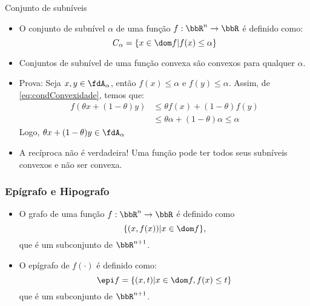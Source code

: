 \begin{frame}{Conjunto de subníveis}
  \begin{itemize}
    \item O conjunto de subnível $\alpha$ de uma função $f: \bbR^n \rightarrow \bbR$ é definido como:
    \begin{equation}
      C_\alpha = \{x \in \dom f | f(x) \leq \alpha\}
      \label{eq:conjuntoSubnivel}
    \end{equation}
    \item Conjuntos de subnível de uma função convexa são convexos para qualquer $\alpha$.
    \item Prova:
    Seja $x, y \in \fdA_\alpha$, então $f(x) \leq \alpha$ e $f(y) \leq \alpha$. Assim, de \eqref{eq:condConvexidade}, 
    temos que:
    \begin{align*}
      f(\theta x + (1-\theta) y) & \leq \theta f(x) + (1-\theta) f(y) \\
      & \leq \theta \alpha + (1-\theta) \alpha \leq \alpha 
    \end{align*}
    Logo, $\theta x + (1-\theta) y \in \fdA_\alpha$
    \item \alert{A recíproca não é verdadeira!} Uma função pode ter todos seus subníveis convexos e não ser convexa.
  \end{itemize}
\end{frame}

\begin{frame}
  \frametitle{\normalsize Epígrafo e Hipografo}
  \begin{itemize}
    \item O grafo de uma função $f: \bbR^n \rightarrow \bbR$ é definido como
    \begin{equation}
      \{ (x, f(x)) | x \in \dom f \},
    \end{equation}
    que é um subconjunto de $\bbR^{n+1}$.
    \item O epígrafo de $f(\cdot)$ é definido como:
    \begin{equation}
      \epi f = \{ (x, t) | x \in \dom f, f(x) \leq t \}
    \end{equation}
    que é um subconjunto de $\bbR^{n+1}$.
    \begin{figure}
      \centering
    \end{figure}
  \end{itemize}
\end{frame}

